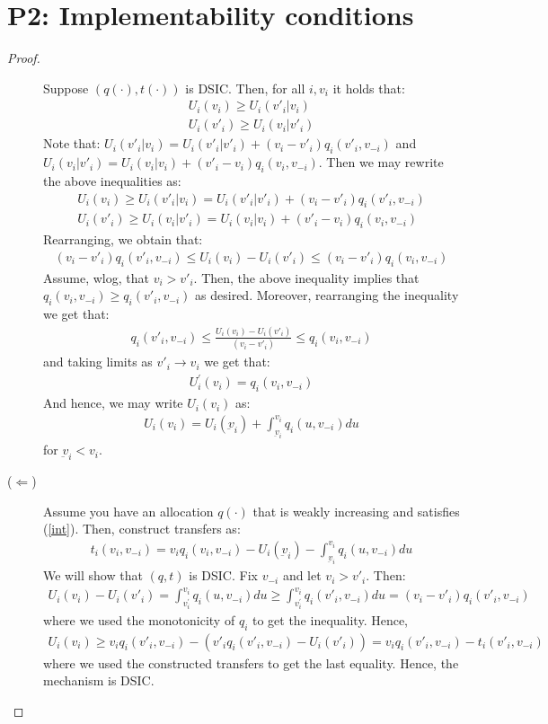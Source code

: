 \documentclass{article}
\newcommand{\enterProblemHeader}[1]{
\nobreak\extramarks{#1}{#1 continued on next page\ldots}\nobreak
\nobreak\extramarks{#1 (continued)}{#1 continued on next page\ldots}\nobreak
}
\newcommand{\exitProblemHeader}[1]{
\nobreak\extramarks{#1 (continued)}{#1 continued on next page\ldots}\nobreak
\nobreak\extramarks{#1}{}\nobreak
}
\newcounter{homeworkProblemCounter} %
\newcommand{\homeworkProblemName}{}
\newenvironment{ex}[1][Problem \arabic{homeworkProblemCounter}]{ %
\stepcounter{homeworkProblemCounter} %
\renewcommand{\homeworkProblemName}{#1} %
\section{\homeworkProblemName} %
}{
}
\begin{document}
\begin{ex}[P2: Implementability conditions]
\begin{proof}
\begin{description}
			Suppose $(q(\cdot),t(\cdot))$ is DSIC. Then, for all $i,v_i$ it holds that:
			\begin{align*}
			U_i(v_i)\geq U_i(v'_i|v_i)\\
			U_i(v'_i)\geq U_i(v_i|v'_i)
			\end{align*}
			Note that: $U_i(v'_i|v_i)=U_i(v'_i|v'_i)+(v_i-v'_i)q_i(v'_i,v_{-i})$ and $U_i(v_i|v'_i)=U_i(v_{i}|v_{i})+(v'_i-v_i)q_i(v_i,v_{-i})$. Then we may rewrite the above inequalities as:
			\begin{align*}
			U_i(v_i)\geq U_i(v'_i|v_i)=U_i(v'_i|v'_i)+(v_i-v'_i)q_i(v'_i,v_{-i})\\
			U_i(v'_i)\geq U_i(v_i|v'_i)=U_i(v_{i}|v_{i})+(v'_i-v_i)q_i(v_i,v_{-i})
			\end{align*}
			Rearranging, we obtain that:
			\begin{align*}
			(v_i-v'_i)q_i(v'_i,v_{-i})\leq U_i(v_i)-U_{i}(v'_i)\leq (v_i-v'_i)q_i(v_i,v_{-i})
			\end{align*}
			Assume, wlog, that $v_i>v'_i$. Then, the above inequality implies that $q_i(v_i,v_{-i})\geq q_i(v'_i,v_{-i})$ as desired. Moreover, rearranging the inequality we get that:
			\begin{align*}
			q_i(v'_i,v_{-i})\leq \frac{U_i(v_i)-U_{i}(v'_i)}{(v_i-v'_i)}\leq q_i(v_i,v_{-i})
			\end{align*}
			and taking limits as $v'_i\rightarrow v_i$ we get that:
			\begin{align*}
			U_i^{'}(v_i)= q_i(v_i,v_{-i})
			\end{align*}
			And hence, we may write $U_i(v_i)$ as:
			\begin{align*}
			U_{i}(v_i)=U_i(\underbar{v}_{i})+\int_{\underbar{v}_{i}}^{v_i}q_{i}(u,v_{-i})du
			\end{align*}
			for $\underbar{v}_i<v_i$.
			
			\item [($\Leftarrow$)] Assume you have an allocation $q(\cdot)$ that is weakly increasing and satisfies (\ref{int}). Then, construct transfers as:
			\begin{align*}
			t_i(v_i,v_{-i})=v_iq_i(v_i,v_{-i})-U_i(\underbar{v}_{i})-\int_{\underbar{v}_{i}}^{v_i}q_{i}(u,v_{-i})du
			\end{align*}
			We will show that $(q,t)$ is DSIC. Fix $v_{-i}$ and let $v_i>v'_i$. Then:
			\begin{align*}
			U_i(v_i)-U_{i}(v'_i)= \int_{v^{'}_{i}}^{v_i}q_{i}(u,v_{-i})du\geq \int_{v^{'}_{i}}^{v_i}q_{i}(v'_i,v_{-i})du=(v_i-v'_i)q_i(v'_i,v_{-i})
			\end{align*}
			where we used the monotonicity of $q_i$ to get the inequality. Hence,
			\begin{align*}
			U_i(v_i)\geq v_iq_i(v'_i,v_{-i})-(v'_iq_i(v'_i,v_{-i})-U_i(v'_i))=v_iq_i(v'_i,v_{-i})-t_i(v'_i,v_{-i})
			\end{align*}
			where we used the constructed transfers to get the last equality. Hence, the mechanism is DSIC.
		\end{description}
	\end{proof}
	\fi
\end{ex}
\end{document}
